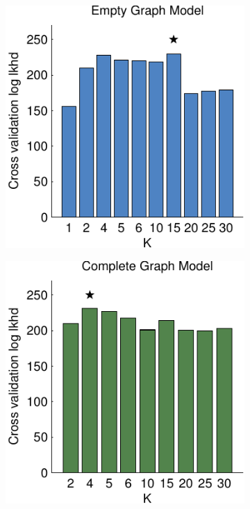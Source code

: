 \begin{figure}[!t]
  \begin{subfigure}[T]{.24\linewidth}
    \begin{center}
      \includegraphics[width=\linewidth]{figures/ch2/icpsr_xv_empty}
    \end{center}
  \end{subfigure}
  \begin{subfigure}[T]{.24\linewidth}
    \begin{center}
      \includegraphics[width=\linewidth]{figures/ch2/icpsr_xv_complete}

\end{center}
\end{subfigure}
\end{figure}
